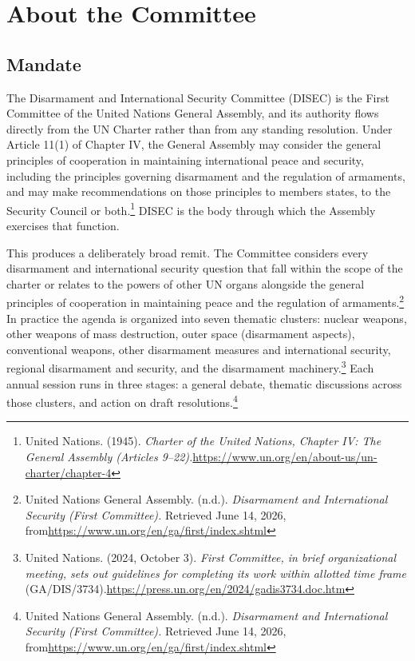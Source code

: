 \section{About the Committee}

\subsection{Mandate}

The Disarmament and International Security Committee (DISEC) is the First Committee of the United Nations General Assembly, and its authority flows directly from the UN Charter rather than from any standing resolution. Under Article 11(1) of Chapter IV, the General Assembly may consider the general principles of cooperation in maintaining international peace and security, including the principles governing disarmament and the regulation of armaments, and may make recommendations on those principles to members states, to the Security Council or both.\footnote{United Nations. (1945). \emph{Charter of the United Nations, Chapter IV: The General Assembly (Articles 9–22).}\url{https://www.un.org/en/about-us/un-charter/chapter-4}} DISEC is the body through which the Assembly exercises that function.

This produces a deliberately broad remit. The Committee considers every disarmament and international security question that fall within the scope of the charter or relates to the powers of other UN organs alongside the general principles of cooperation in maintaining peace and the regulation of armaments.\footnote{United Nations General Assembly. (n.d.). \emph{Disarmament and International Security (First Committee).} Retrieved June 14, 2026, from\url{https://www.un.org/en/ga/first/index.shtml}} In practice the agenda is organized into seven thematic clusters: nuclear weapons, other weapons of mass destruction, outer space (disarmament aspects), conventional weapons, other disarmament measures and international security, regional disarmament and security, and the disarmament machinery.\footnote{United Nations. (2024, October 3). \emph{First Committee, in brief organizational meeting, sets out guidelines for completing its work within allotted time frame} (GA/DIS/3734).\url{https://press.un.org/en/2024/gadis3734.doc.htm}} Each annual session runs in three stages: a general debate, thematic discussions across those clusters, and action on draft resolutions.\footnote{United Nations General Assembly. (n.d.). \emph{Disarmament and International Security (First Committee).} Retrieved June 14, 2026, from\url{https://www.un.org/en/ga/first/index.shtml}}

